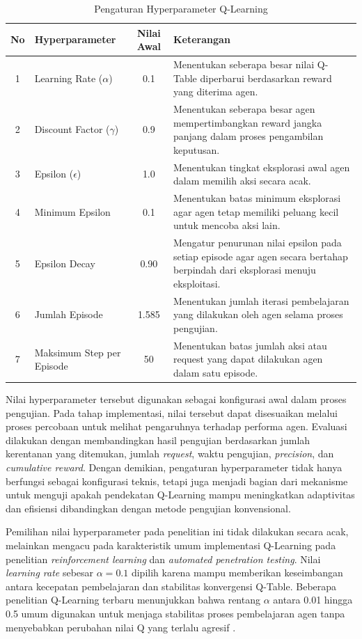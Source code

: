 \begin{table}[H]
\centering
\begin{tabular}{|c|l|c|p{7cm}|}
\hline
\textbf{No} & \textbf{Hyperparameter} & \textbf{Nilai Awal} & \textbf{Keterangan} \\ \hline

1 & Learning Rate ($\alpha$) & 0.1 & Menentukan seberapa besar nilai Q-Table diperbarui berdasarkan reward yang diterima agen. \\ \hline
2 & Discount Factor ($\gamma$) & 0.9 & Menentukan seberapa besar agen mempertimbangkan reward jangka panjang dalam proses pengambilan keputusan. \\ \hline
3 & Epsilon ($\epsilon$) & 1.0 & Menentukan tingkat eksplorasi awal agen dalam memilih aksi secara acak. \\ \hline
4 & Minimum Epsilon & 0.1 & Menentukan batas minimum eksplorasi agar agen tetap memiliki peluang kecil untuk mencoba aksi lain. \\ \hline
5 & Epsilon Decay & 0.90 & Mengatur penurunan nilai epsilon pada setiap episode agar agen secara bertahap berpindah dari eksplorasi menuju eksploitasi. \\ \hline
6 & Jumlah Episode & 1.585 & Menentukan jumlah iterasi pembelajaran yang dilakukan oleh agen selama proses pengujian. \\ \hline
7 & Maksimum Step per Episode & 50 & Menentukan batas jumlah aksi atau request yang dapat dilakukan agen dalam satu episode. \\ \hline

\end{tabular}
\caption{Pengaturan Hyperparameter Q-Learning}
\label{tab:hyperparameter_qlearning}
\end{table}

Nilai hyperparameter tersebut digunakan sebagai konfigurasi awal dalam proses pengujian. Pada tahap implementasi, nilai tersebut dapat disesuaikan melalui proses percobaan untuk melihat pengaruhnya terhadap performa agen. Evaluasi dilakukan dengan membandingkan hasil pengujian berdasarkan jumlah kerentanan yang ditemukan, jumlah \textit{request}, waktu pengujian, \textit{precision}, dan \textit{cumulative reward}. Dengan demikian, pengaturan hyperparameter tidak hanya berfungsi sebagai konfigurasi teknis, tetapi juga menjadi bagian dari mekanisme untuk menguji apakah pendekatan Q-Learning mampu meningkatkan adaptivitas dan efisiensi dibandingkan dengan metode pengujian konvensional.

Pemilihan nilai hyperparameter pada penelitian ini tidak dilakukan secara acak, melainkan mengacu pada karakteristik umum implementasi Q-Learning pada penelitian \textit{reinforcement learning} dan \textit{automated penetration testing}. Nilai \textit{learning rate} sebesar $\alpha = 0.1$ dipilih karena mampu memberikan keseimbangan antara kecepatan pembelajaran dan stabilitas konvergensi Q-Table. Beberapa penelitian Q-Learning terbaru menunjukkan bahwa rentang $\alpha$ antara 0.01 hingga 0.5 umum digunakan untuk menjaga stabilitas proses pembelajaran agen tanpa menyebabkan perubahan nilai Q yang terlalu agresif \cite{becker2024evaluation,sensors2025rlpentest}.

